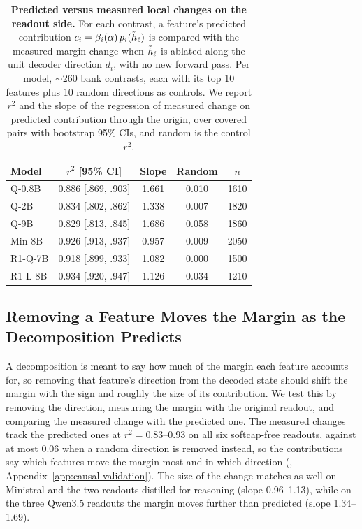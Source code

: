 \begin{table}[t]
\caption{\textbf{Predicted versus measured local changes on the readout side.}
For each contrast, a feature's predicted contribution
\(c_i=\beta_i(\alpha)\,p_i(\tilde h_\ell)\) is compared with the measured margin
change when \(\tilde h_\ell\) is ablated along the unit decoder direction \(d_i\),
with no new forward pass.
Per model, \(\sim\)260 bank contrasts, each with its top 10 features plus 10
random directions as controls. We report \(r^2\) and the slope of the
regression of measured change on predicted contribution through the
origin, over covered pairs with bootstrap 95\% CIs,
and random is the control \(r^2\).}
\label{tab:causal-validation-summary}
\centering
\scriptsize
\setlength{\tabcolsep}{3.2pt}
\renewcommand{\arraystretch}{1.06}
\begin{tabular*}{\linewidth}{@{\extracolsep{\fill}}lcccc@{}}
\toprule
Model & \(r^2\) [95\% CI] & Slope & Random & \(n\) \\
\midrule
Q-0.8B & 0.886 [.869, .903] & 1.661 & 0.010 & 1610 \\
Q-2B   & 0.834 [.802, .862] & 1.338 & 0.007 & 1820 \\
Q-9B   & 0.829 [.813, .845] & 1.686 & 0.058 & 1860 \\
Min-8B & 0.926 [.913, .937] & 0.957 & 0.009 & 2050 \\
R1-Q-7B & 0.918 [.899, .933] & 1.082 & 0.000 & 1500 \\
R1-L-8B & 0.934 [.920, .947] & 1.126 & 0.034 & 1210 \\
\bottomrule
\end{tabular*}
\end{table}

\subsection{Removing a Feature Moves the Margin as the Decomposition Predicts}\label{subsec:causal-validation}
A decomposition is meant to say how much of the margin each feature
accounts for, so removing that feature's direction from the decoded
state should shift the margin with the sign and roughly the size of
its contribution. We test this by removing the direction, measuring
the margin with the original readout,
and comparing the measured change with the predicted one. The measured
changes track the predicted ones at \(r^2=0.83\)--\(0.93\) on all six
softcap-free readouts, against at most 0.06 when a random direction is
removed instead, so the contributions say which features move the
margin most and in which direction
(,
Appendix~\ref{app:causal-validation}). The size of the change matches
as well on Ministral and the two readouts distilled for reasoning
(slope 0.96--1.13), while on the three Qwen3.5 readouts the margin moves
further than predicted (slope 1.34--1.69).

